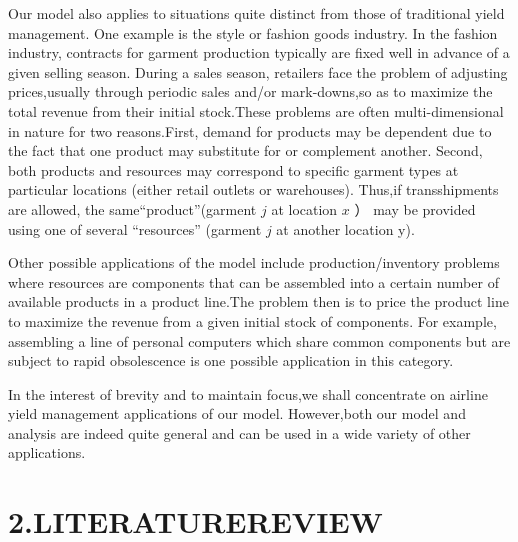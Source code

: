 Our model also applies to situations quite distinct from those of
traditional yield management. One example is the style or fashion goods
industry. In the fashion industry, contracts for garment production
typically are fixed well in advance of a given selling season. During a
sales season, retailers face the problem of adjusting prices,usually
through periodic sales and/or mark-downs,so as to maximize the total
revenue from their initial stock.These problems are often
multi-dimensional in nature for two reasons.First, demand for products
may be dependent due to the fact that one product may substitute for or
complement another. Second, both products and resources may correspond
to specific garment types at particular locations (either retail outlets
or warehouses). Thus,if transshipments are allowed, the
same``product''(garment \(j\) at location \(x\) ） may be provided using
one of several ``resources'' (garment \(j\) at another location y).

Other possible applications of the model include production/inventory
problems where resources are components that can be assembled into a
certain number of available products in a product line.The problem then
is to price the product line to maximize the revenue from a given
initial stock of components. For example, assembling a line of personal
computers which share common components but are subject to rapid
obsolescence is one possible application in this category.

In the interest of brevity and to maintain focus,we shall concentrate on
airline yield management applications of our model. However,both our
model and analysis are indeed quite general and can be used in a wide
variety of other applications.

\section{2.LITERATUREREVIEW}\label{literaturereview}

